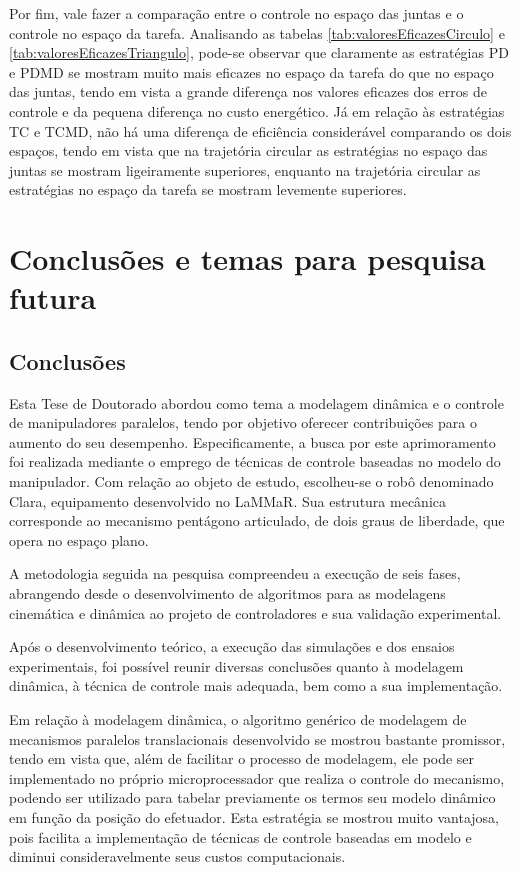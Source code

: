 \documentclass[]{politex}
\begin{document}
Por fim, vale fazer a comparação entre o controle no espaço das juntas e o controle no espaço da tarefa. Analisando as tabelas \ref{tab:valoresEficazesCirculo} e \ref{tab:valoresEficazesTriangulo}, pode-se observar que claramente as estratégias PD e PDMD se mostram muito mais eficazes no espaço da tarefa do que no espaço das juntas, tendo em vista a grande diferença nos valores eficazes dos erros de controle e da pequena diferença no custo energético. Já em relação às estratégias TC e TCMD, não há uma diferença de eficiência considerável comparando os dois espaços, tendo em vista que na trajetória circular as estratégias no espaço das juntas se mostram ligeiramente superiores, enquanto na trajetória circular as estratégias no espaço da tarefa se mostram levemente superiores.




\chapter{Conclusões e temas para pesquisa futura}

\section{Conclusões}

Esta Tese de Doutorado abordou como tema a modelagem dinâmica e o controle de manipuladores paralelos, tendo por objetivo oferecer contribuições para o aumento do seu desempenho. Especificamente, a busca por este aprimoramento foi realizada mediante o emprego de técnicas de controle baseadas no modelo do manipulador. Com relação ao objeto de estudo, escolheu-se o robô denominado Clara, equipamento desenvolvido no LaMMaR. Sua estrutura mecânica corresponde ao mecanismo pentágono articulado, de dois graus de liberdade, que opera no espaço plano. 

A metodologia seguida na pesquisa compreendeu a execução de seis fases, abrangendo desde o desenvolvimento de algoritmos para as modelagens cinemática e dinâmica ao projeto de controladores e sua validação experimental.

Após o desenvolvimento teórico, a execução das simulações e dos ensaios experimentais, foi possível reunir diversas conclusões quanto à modelagem dinâmica, à técnica de controle mais adequada, bem como a sua implementação.

Em relação à modelagem dinâmica, o algoritmo genérico de modelagem de mecanismos paralelos translacionais desenvolvido se mostrou bastante promissor, tendo em vista que, além de facilitar o processo de modelagem, ele pode ser implementado no próprio microprocessador que realiza o controle do mecanismo, podendo ser utilizado para tabelar previamente os termos seu modelo dinâmico em função da posição do efetuador. Esta estratégia se mostrou muito vantajosa, pois facilita a implementação de técnicas de controle baseadas em modelo e diminui consideravelmente seus custos computacionais.
\end{document}
